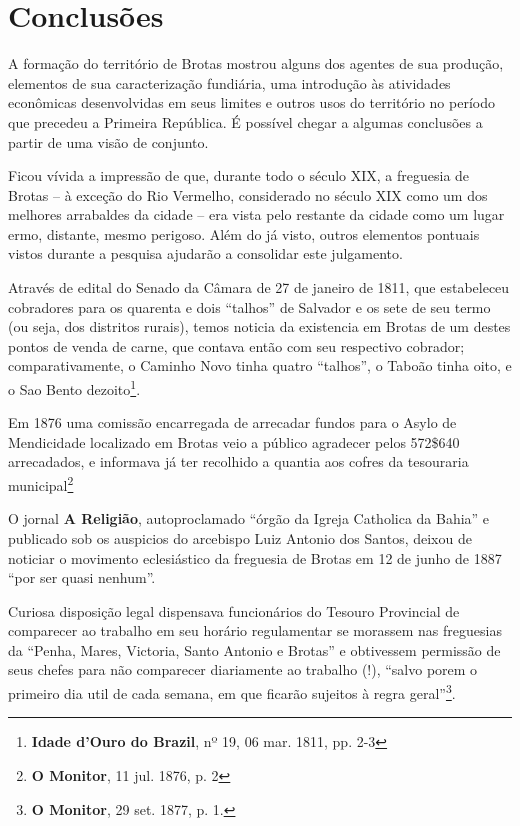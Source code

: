 \section{Conclusões}

A formação do território de Brotas mostrou alguns dos agentes de sua produção, elementos de sua caracterização fundiária, uma introdução às atividades econômicas desenvolvidas em seus limites e outros usos do território no período que precedeu a Primeira República. É possível chegar a algumas conclusões a partir de uma visão de conjunto.

Ficou vívida a impressão de que, durante todo o século XIX, a freguesia de Brotas -- à exceção do Rio Vermelho, considerado no século XIX como um dos melhores arrabaldes da cidade -- era vista pelo restante da cidade como um lugar ermo, distante, mesmo perigoso. Além do já visto, outros elementos pontuais vistos durante a pesquisa ajudarão a consolidar este julgamento.

Através de edital do Senado da Câmara de 27 de janeiro de 1811, que estabeleceu cobradores para os quarenta e dois ``talhos'' de Salvador e os sete de seu termo (ou seja, dos distritos rurais), temos noticia da existencia em Brotas de um destes pontos de venda de carne, que contava então com seu respectivo cobrador; comparativamente, o Caminho Novo tinha quatro ``talhos'', o Taboão tinha oito, e o Sao Bento dezoito\footnote{\textbf{Idade d'Ouro do Brazil}, nº 19, 06 mar. 1811, pp. 2-3}.

Em 1876 uma comissão encarregada de arrecadar fundos para o Asylo de Mendicidade localizado em Brotas veio a público agradecer pelos 572\$640 arrecadados, e informava já ter recolhido a quantia aos cofres da tesouraria municipal\footnote{\textbf{O Monitor}, 11 jul. 1876, p. 2}

O jornal \textbf{A Religião}, autoproclamado ``órgão da Igreja Catholica da Bahia'' e publicado sob os auspicios do arcebispo Luiz Antonio dos Santos, deixou de noticiar o movimento eclesiástico da freguesia de Brotas em 12 de junho de 1887 ``por ser quasi nenhum''.

Curiosa disposição legal dispensava funcionários do Tesouro Provincial de comparecer ao trabalho em seu horário regulamentar se morassem nas freguesias da ``Penha, Mares, Victoria, Santo Antonio e Brotas'' e obtivessem permissão de seus chefes para não comparecer diariamente ao trabalho (!), ``salvo porem o primeiro dia util de cada semana, em que ficarão sujeitos à regra geral''\footnote{\textbf{O Monitor}, 29 set. 1877, p. 1.}.

